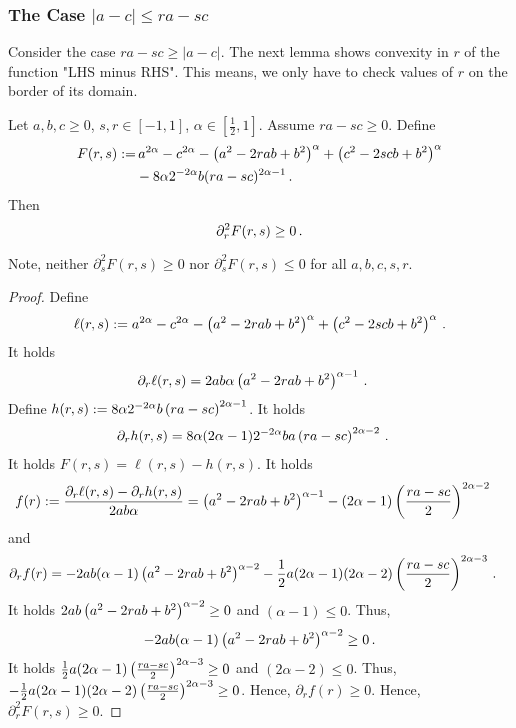 \subsubsection{The Case $|a-c| \leq ra-sc$}
%
Consider the case $ra-sc \geq |a-c|$. The next lemma shows convexity in $r$ of the function "LHS minus RHS". This means, we only have to check values of $r$ on the border of its domain.
%
\begin{lemma}[Convexity in $r$]\label{lmm:ddr}
	Let $a,b,c\geq0$, $s,r\in[-1,1]$, $\alpha\in[\frac12,1]$.
	Assume $ra - sc \geq 0$.
	Define 
	\begin{align*}
		F(r,s) 
		:= 
		&\,a^{2\alpha}-c^{2\alpha}-\left( a^2-2rab+b^2 \right)^\alpha+\left( c^2-2scb+b^2 \right)^\alpha 
		\\&-
		8 \alpha 2^{-2\alpha} b (ra - sc)^{2\alpha-1}
		\, .
	\end{align*}
	Then
	\begin{equation*}
		\partial_r^2 F(r,s) \geq 0
		\, .
	\end{equation*}
\end{lemma}
%
Note, neither $\partial_s^2 F(r,s) \geq 0$ nor $\partial_s^2 F(r,s) \leq 0$ for all $a,b,c,s,r$.
%
\begin{proof}
	Define
	\begin{equation*}
		\ell(r,s) := a^{2\alpha}-c^{2\alpha}-\left( a^2-2rab+b^2 \right)^\alpha+\left( c^2-2scb+b^2 \right)^\alpha 
		\, .
	\end{equation*}
	It holds
	\begin{align*}
		\partial_r \ell(r,s) &= 2ab\alpha\left( a^2-2rab+b^2 \right)^{\alpha-1}\, .
	\end{align*}
	Define $h(r,s) := 8 \alpha 2^{-2\alpha} b \left( ra - sc \right)^{2\alpha-1}$. It holds
	\begin{align*}
		\partial_r h(r,s) &= 8 \alpha (2\alpha-1) 2^{-2\alpha} b a \left( ra - sc \right)^{2\alpha-2}\, .
	\end{align*}
	It holds $F(r,s) = \ell(r,s)-h(r,s)$.
	It holds
	\begin{align*}
		f(r) :=	 \frac{	\partial_r \ell(r,s)-\partial_r h(r,s)}{2ab\alpha} &= \left( a^2-2rab+b^2 \right)^{\alpha-1} - (2\alpha-1) \left( \frac{ra - sc}{2} \right)^{2\alpha-2}
	\end{align*}
	and 
	\begin{align*}
		\partial_r f(r) 
		&= 
		-2ab(\alpha-1) \left( a^2-2rab+b^2 \right)^{\alpha-2} 
		- \frac12 a(2\alpha-1)(2\alpha-2) \left( \frac{ra - sc}{2} \right)^{2\alpha-3} 
		\, .
	\end{align*}
	It holds $2ab \left( a^2-2rab+b^2 \right)^{\alpha-2} \geq 0$ and $(\alpha-1) \leq 0$. Thus,
	\begin{equation*}
		-2ab(\alpha-1) \left( a^2-2rab+b^2 \right)^{\alpha-2} \geq 0\, .
	\end{equation*}
	It holds $\frac12 a(2\alpha-1) \left( \frac{ra - sc}{2} \right)^{2\alpha-3} \geq 0$ and  $(2\alpha-2)\leq 0$. Thus, $-\frac12 a(2\alpha-1)(2\alpha-2) \left( \frac{ra - sc}{2} \right)^{2\alpha-3} \geq 0$. Hence,	$\partial_r f(r) \geq 0$. Hence, $\partial_r^2 F(r,s) \geq 0$.
\end{proof}
%
%
%
%
%
